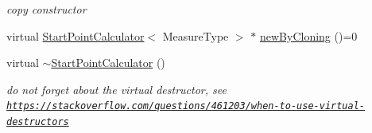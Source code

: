 \begin{DoxyCompactItemize}
\begin{DoxyCompactList}\small\item\em copy constructor \end{DoxyCompactList}\item 
virtual \hyperlink{class_ox_1_1_start_point_calculator}{Start\+Point\+Calculator}$<$ Measure\+Type $>$ $\ast$ \hyperlink{class_ox_1_1_start_point_calculator_acd2a221872002157f232e1e7f73a1859}{new\+By\+Cloning} ()=0
\item 
virtual \hyperlink{class_ox_1_1_start_point_calculator_a210c3312a8926b750dba8e498c6b620a}{$\sim$\+Start\+Point\+Calculator} ()\hypertarget{class_ox_1_1_start_point_calculator_a210c3312a8926b750dba8e498c6b620a}{}\label{class_ox_1_1_start_point_calculator_a210c3312a8926b750dba8e498c6b620a}

\begin{DoxyCompactList}\small\item\em do not forget about the virtual destructor, see \href{https://stackoverflow.com/questions/461203/when-to-use-virtual-destructors}{\tt https\+://stackoverflow.\+com/questions/461203/when-\/to-\/use-\/virtual-\/destructors} \end{DoxyCompactList}\end{DoxyCompactItemize}
